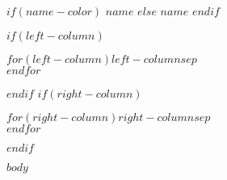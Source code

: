 \documentclass[$if(fontsize)$$fontsize$$else$10pt$endif$,letterpaper]{article}
\def\name{$name$}
\begin{document}
$if(name-color)$
{\huge\color{$name-color$}\sffamily\bfseries \name}
$else$
{\huge \name}
$endif$

\bigskip

$if(left-column)$
\begin{minipage}[t]{0.495\textwidth}
  $for(left-column)$$left-column$$sep$ \\ $endfor$
\end{minipage} %
$endif$
$if(right-column)$
\begin{minipage}[t]{0.495\textwidth}
  $for(right-column)$$right-column$$sep$ \\ $endfor$
\end{minipage}
$endif$

$body$
\end{document}

